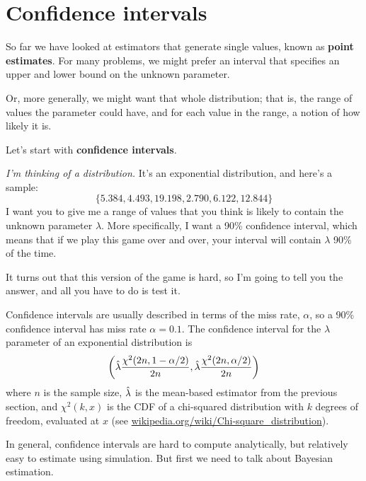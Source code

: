 \documentclass[12pt]{book}
\begin{document}
\section{Confidence intervals}



So far we have looked at estimators that generate single values, known
as {\bf point estimates}.  For many problems, we might prefer an interval
that specifies an upper and lower bound on the unknown parameter.

Or, more generally, we might want that whole distribution; that is,
the range of values the parameter could have, and for each value in
the range, a notion of how likely it is.

Let's start with {\bf confidence intervals}.


{\em I'm thinking of a distribution.}  It's an exponential distribution, and 
here's a sample:
%
\[ \{ 5.384, 4.493, 19.198, 2.790, 6.122, 12.844 \} \]
%
I want you to give me a range of values that you think is likely to
contain the unknown parameter $\lambda$.  More specifically, I want
a 90\% confidence interval, which means that if we play this game over
and over, your interval will contain $\lambda$ 90\% of the time.

It turns out that this version of the game is hard, so I'm going
to tell you the answer, and all you have to do is test it.

Confidence intervals are usually described in terms of the miss rate,
$\alpha$, so a 90\% confidence interval has miss rate $\alpha = 0.1$.
The confidence interval for the $\lambda$ parameter of an exponential
distribution is
%
\[ \left( \hat{\lambda} \frac{\chi^2(2n, 1-\alpha/2)}{2n},
      \hat{\lambda} \frac{\chi^2(2n, \alpha/2)}{2n} \right) \]
%
where $n$ is the sample size, $\hat{\lambda}$ is the mean-based estimator
from the previous section, and $\chi^2(k, x)$ is the CDF of a
chi-squared distribution with $k$ degrees of freedom, evaluated at $x$
(see \url{wikipedia.org/wiki/Chi-square_distribution}).


In general, confidence intervals are hard to compute analytically, but
relatively easy to estimate using simulation.  But first we need
to talk about Bayesian estimation.
\end{document}
